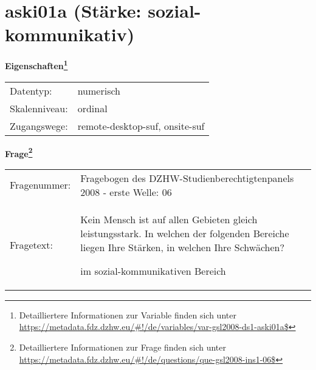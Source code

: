 
    \setcounter{footnote}{0}

    \vspace*{-1.8cm}
	\section{aski01a (Stärke: sozial-kommunikativ)}
	\label{section:aski01a}



    \vspace*{0.5cm}
    \noindent\textbf{Eigenschaften\footnote{Detailliertere Informationen zur Variable finden sich unter
		\url{https://metadata.fdz.dzhw.eu/\#!/de/variables/var-gsl2008-ds1-aski01a$}}}\\
	\begin{tabularx}{\hsize}{@{}lX}
	Datentyp: & numerisch \\
	Skalenniveau: & ordinal \\
	Zugangswege: &
	  remote-desktop-suf, 
	  onsite-suf
 \\
    \end{tabularx}



				\vspace*{0.5cm}
                \noindent\textbf{Frage\footnote{Detailliertere Informationen zur Frage finden sich unter
		              \url{https://metadata.fdz.dzhw.eu/\#!/de/questions/que-gsl2008-ins1-06$}}}\\
				\begin{tabularx}{\hsize}{@{}lX}
					Fragenummer: &
					  Fragebogen des DZHW-Studienberechtigtenpanels 2008 - erste Welle:
					  06
 \\
					Fragetext: & Kein Mensch ist auf allen Gebieten gleich leistungsstark. In welchen der folgenden Bereiche liegen Ihre Stärken, in welchen Ihre Schwächen?\par  im sozial-kommunikativen Bereich \\
				\end{tabularx}





